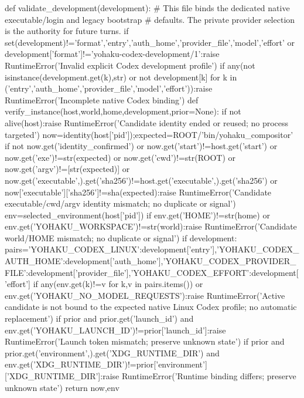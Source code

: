 def validate_development(development):
 # This file binds the dedicated native executable/login and legacy bootstrap
 # defaults. The private provider selection is the authority for future turns.
 if set(development)!={'format','entry','auth_home','provider_file','model','effort'} or development['format']!='yohaku-codex-development/1':raise RuntimeError('Invalid explicit Codex development profile')
 if any(not isinstance(development.get(k),str) or not development[k] for k in ('entry','auth_home','provider_file','model','effort')):raise RuntimeError('Incomplete native Codex binding')
def verify_instance(host,world,home,development,prior=None):
 if not alive(host):raise RuntimeError('Candidate identity ended or reused; no process targeted')
 now=identity(host['pid']);expected=ROOT/'bin/yohaku_compositor'
 if not now.get('identity_confirmed') or now.get('start')!=host.get('start') or now.get('exe')!=str(expected) or now.get('cwd')!=str(ROOT) or now.get('argv')!=[str(expected)] or now.get('executable',{}).get('sha256')!=host.get('executable',{}).get('sha256') or now['executable']['sha256']!=sha(expected):raise RuntimeError('Candidate executable/cwd/argv identity mismatch; no duplicate or signal')
 env=selected_environment(host['pid'])
 if env.get('HOME')!=str(home) or env.get('YOHAKU_WORKSPACE')!=str(world):raise RuntimeError('Candidate world/HOME mismatch; no duplicate or signal')
 if development:
  pairs={'YOHAKU_CODEX_LINUX':development['entry'],'YOHAKU_CODEX_AUTH_HOME':development['auth_home'],'YOHAKU_CODEX_PROVIDER_FILE':development['provider_file'],'YOHAKU_CODEX_EFFORT':development['effort']}
  if any(env.get(k)!=v for k,v in pairs.items()) or env.get('YOHAKU_NO_MODEL_REQUESTS'):raise RuntimeError('Active candidate is not bound to the expected native Linux Codex profile; no automatic replacement')
 if prior and prior.get('launch_id') and env.get('YOHAKU_LAUNCH_ID')!=prior['launch_id']:raise RuntimeError('Launch token mismatch; preserve unknown state')
 if prior and prior.get('environment',{}).get('XDG_RUNTIME_DIR') and env.get('XDG_RUNTIME_DIR')!=prior['environment']['XDG_RUNTIME_DIR']:raise RuntimeError('Runtime binding differs; preserve unknown state')
 return now,env

